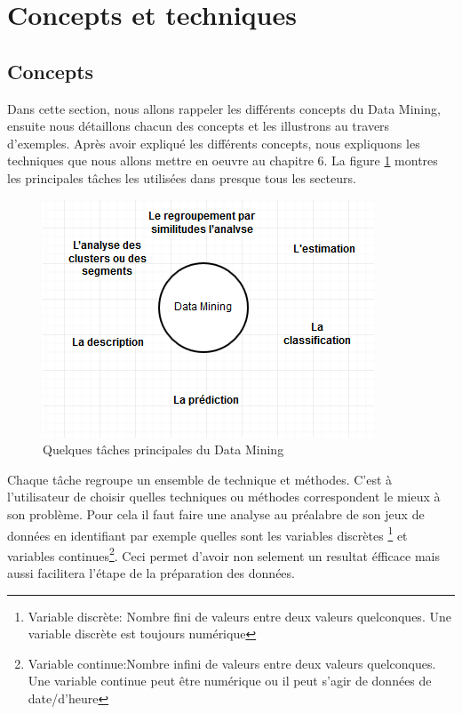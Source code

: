\documentclass[11pt,a4paper]{report}
\begin{document}
\newpage

\section{Concepts et techniques}
%
%
%
\subsection{Concepts}
%
%
%
Dans cette section, nous allons rappeler les différents concepts du Data Mining, ensuite nous détaillons chacun des concepts et les illustrons au travers d'exemples. Après avoir expliqué les différents concepts, nous expliquons les techniques que nous allons mettre en oeuvre au chapitre 6. La figure \ref{conceptsdm} montres les principales tâches les utilisées dans presque tous les secteurs. 
\begin{figure}[h]
   \centering
   \includegraphics[scale=0.80]{application_word.PNG}
     \caption{Quelques tâches principales du Data Mining}
     \label{conceptsdm}
\end{figure}

Chaque tâche regroupe un ensemble de technique et méthodes. C'est à l'utilisateur de choisir quelles techniques ou méthodes correspondent le mieux à son problème. Pour cela il faut faire une analyse au préalabre de son jeux de données en identifiant par exemple quelles sont les variables discrètes \footnote{Variable discrète: Nombre fini de valeurs entre deux valeurs quelconques. Une variable discrète est toujours numérique} et variables continues\footnote{Variable continue:Nombre infini de valeurs entre deux valeurs quelconques. Une variable continue peut être numérique ou il peut s'agir de données de date/d'heure}. Ceci permet d'avoir non selement un resultat éfficace mais aussi facilitera l'étape de la préparation des données. 
\end{document}
